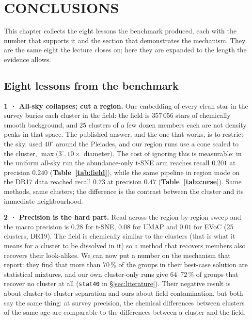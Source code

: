 \section{CONCLUSIONS}
\label{sec:conclusions}


This chapter collects the eight lessons the benchmark produced, each with the
number that supports it and the section that demonstrates the mechanism. They
are the same eight the lecture closes on; here they are expanded to the length
the evidence allows.

\subsection{Eight lessons from the benchmark}

\textbf{1 · All-sky collapses; cut a region.} One embedding of every clean star
in the survey buries each cluster in the field: the field is 357\,056 stars of
chemically smooth background, and 25 clusters of a few dozen members each are
not density peaks in that space. The published answer, and the one that works,
is to restrict the sky. \citet{Kos:17} used $40^\circ$ around the Pleiades, and
our region runs use a cone scaled to the cluster, $\max(3^\circ, 10\times$
diameter$)$. The cost of ignoring this is measurable: in the uniform all-sky
run the abundance-only t-SNE arm reaches recall $0.201$ at precision $0.240$
(\textbf{Table~\ref{tab:field}}), while the same pipeline in region mode on the
DR17 data reached recall $0.73$ at precision $0.47$
(\textbf{Table~\ref{tab:curse}}). Same methods, same clusters; the difference
is the contrast between the cluster and its immediate neighbourhood.

\textbf{2 · Precision is the hard part.} Read across the region-by-region sweep
and the macro precision is $0.28$ for t-SNE, $0.08$ for UMAP and $0.01$ for
EVoC (25 clusters, DR19). The field is chemically similar to the clusters (that
is what it means for a cluster to be dissolved in it) so a method that recovers
members also recovers their look-alikes. We can now put a number on the
mechanism that \citet{Casamiquela:21} report: they find that more than 70\,\%
of the groups in their best-case solution are statistical mixtures, and our own
cluster-only runs give $64$--$72\,\%$ of groups that recover no cluster at all
(\texttt{stat40} in \S\ref{sec:literature}). Their negative result is about
cluster-to-cluster separation and ours about field contamination, but both say
the same thing: at survey precision, the chemical differences between clusters
of the same age are comparable to the differences between a cluster and the
field.

